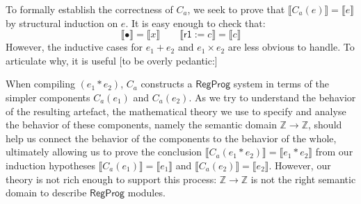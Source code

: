 \documentclass[acmsmall,10pt,review,anonymous]{acmart}
\newcommand{\kw}[1]{\ensuremath{ \textsf{#1} }}
\begin{document}
{To formally establish the correctness of $C_a$,
we seek to prove that
$\llbracket C_a(e) \rrbracket = \llbracket e \rrbracket$
by structural induction on $e$.
It is easy enough to check that:
\[
  \llbracket \bullet \rrbracket = \llbracket x \rrbracket \qquad
  \llbracket \kw{r1} := c \rrbracket = \llbracket c \rrbracket
\]
However,
the inductive cases for $e_1 + e_2$ and $e_1 \times e_2$
are less obvious to handle.
To articulate why,
it is useful [to be overly pedantic:]

When compiling $(e_1 * e_2)$,
$C_a$ constructs a $\kw{RegProg}$ system
in terms of the simpler components $C_a(e_1)$ and $C_a(e_2)$.
As we try to understand the behavior of the resulting artefact,
the mathematical theory we use to specify and analyse
the behavior of these components,
namely the semantic domain $\mathbb{Z} \rightarrow \mathbb{Z}$,
should help us connect
the behavior of the components to
the behavior of the whole,
ultimately allowing us to prove
the conclusion $\llbracket C_a(e_1 * e_2) \rrbracket = \llbracket e_1 * e_2 \rrbracket$
from our induction hypotheses
$\llbracket C_a(e_1) \rrbracket = \llbracket e_1 \rrbracket$ and
$\llbracket C_a(e_2) \rrbracket = \llbracket e_2 \rrbracket$.
However,
our theory is not rich enough to support this process:
$\mathbb{Z} \rightarrow \mathbb{Z}$
is not the right semantic domain
to describe $\kw{RegProg}$ modules.


} %

\end{document}
